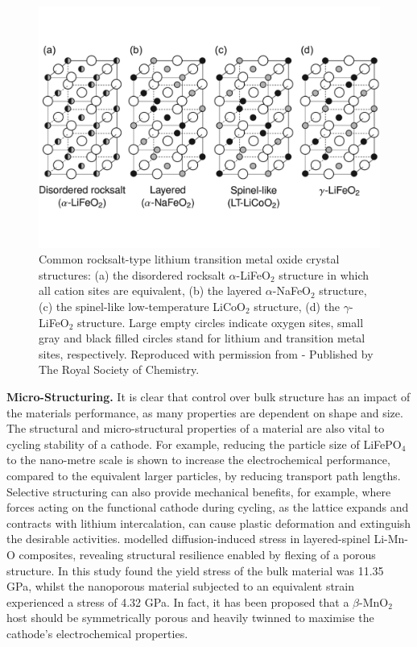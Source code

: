 \documentclass[../main.tex]{subfiles}
\begin{document}
\begin{figure}
    \centering
    \includegraphics[scale=0.4]{figures/structures.pdf}
    \caption{Common rocksalt-type lithium transition metal oxide crystal structures: (a) the disordered rocksalt $\alpha$-LiFeO$_2$ structure in which all cation sites are equivalent, (b) the layered $\alpha$-NaFeO$_2$ structure, (c) the spinel-like low-temperature LiCoO$_2$ structure, (d) the $\gamma$-LiFeO$_2$ structure. Large empty circles indicate oxygen sites, small gray and black filled circles stand for lithium and transition metal sites, respectively. Reproduced with permission from \citeauthor{clement2020} \cite{clement2020} - Published by The Royal Society of Chemistry.}
    \label{fig:structure}
\end{figure}

\textbf{Micro-Structuring.} It is clear that control over bulk structure has an impact of the materials performance, as many properties are dependent on shape and size. \cite{bruce2008nanomaterials} The structural and micro-structural properties of a material are also vital to cycling stability of a cathode. For example, reducing the particle size of LiFePO$_4$ to the nano-metre scale is shown to increase the electrochemical performance, compared to the equivalent larger particles, by reducing transport path lengths. \cite{franger2006chemistry, ellis2007synthesis,malik2010particle} Selective structuring can also provide mechanical benefits, for example, where forces acting on the functional cathode during cycling, as the lattice expands and contracts with lithium intercalation, can cause plastic deformation and extinguish the desirable activities. \citeauthor{sayle2018stress} modelled diffusion-induced stress in layered-spinel Li-Mn-O composites, revealing structural resilience enabled by flexing of a porous structure. \cite{sayle2018stress} In this study \citeauthor{sayle2018stress} found the yield stress of the bulk material was 11.35 GPa, whilst the nanoporous material subjected to an equivalent strain experienced a stress of 4.32 GPa. In fact, it has been proposed that a $\beta$-MnO$_2$ host should be symmetrically porous and heavily twinned to maximise the cathode's electrochemical properties. \cite{sayle2009predicting}
\end{document}
